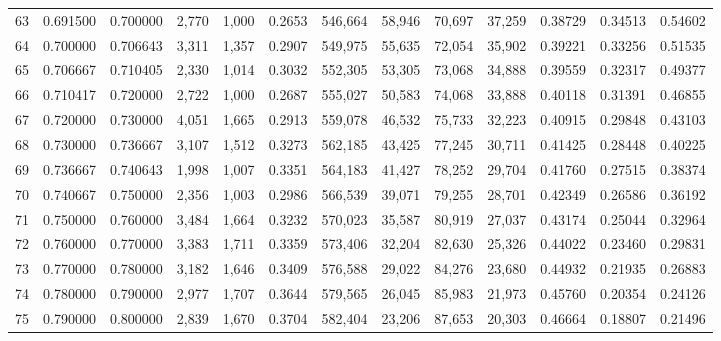 \begin{tabular}{rrrrrrrrrrrrr}
63 &  0.691500 &  0.700000 &   2,770 &  1,000 &                                     0.2653 &  546,664 &   58,946 &   70,697 &   37,259 &  0.38729 &  0.34513 &  0.54602 \\
64 &  0.700000 &  0.706643 &   3,311 &  1,357 &                                     0.2907 &  549,975 &   55,635 &   72,054 &   35,902 &  0.39221 &  0.33256 &  0.51535 \\
65 &  0.706667 &  0.710405 &   2,330 &  1,014 &                                     0.3032 &  552,305 &   53,305 &   73,068 &   34,888 &  0.39559 &  0.32317 &  0.49377 \\
66 &  0.710417 &  0.720000 &   2,722 &  1,000 &                                     0.2687 &  555,027 &   50,583 &   74,068 &   33,888 &  0.40118 &  0.31391 &  0.46855 \\
67 &  0.720000 &  0.730000 &   4,051 &  1,665 &                                     0.2913 &  559,078 &   46,532 &   75,733 &   32,223 &  0.40915 &  0.29848 &  0.43103 \\
68 &  0.730000 &  0.736667 &   3,107 &  1,512 &                                     0.3273 &  562,185 &   43,425 &   77,245 &   30,711 &  0.41425 &  0.28448 &  0.40225 \\
69 &  0.736667 &  0.740643 &   1,998 &  1,007 &                                     0.3351 &  564,183 &   41,427 &   78,252 &   29,704 &  0.41760 &  0.27515 &  0.38374 \\
70 &  0.740667 &  0.750000 &   2,356 &  1,003 &                                     0.2986 &  566,539 &   39,071 &   79,255 &   28,701 &  0.42349 &  0.26586 &  0.36192 \\
71 &  0.750000 &  0.760000 &   3,484 &  1,664 &                                     0.3232 &  570,023 &   35,587 &   80,919 &   27,037 &  0.43174 &  0.25044 &  0.32964 \\
72 &  0.760000 &  0.770000 &   3,383 &  1,711 &                                     0.3359 &  573,406 &   32,204 &   82,630 &   25,326 &  0.44022 &  0.23460 &  0.29831 \\
73 &  0.770000 &  0.780000 &   3,182 &  1,646 &                                     0.3409 &  576,588 &   29,022 &   84,276 &   23,680 &  0.44932 &  0.21935 &  0.26883 \\
74 &  0.780000 &  0.790000 &   2,977 &  1,707 &                                     0.3644 &  579,565 &   26,045 &   85,983 &   21,973 &  0.45760 &  0.20354 &  0.24126 \\
75 &  0.790000 &  0.800000 &   2,839 &  1,670 &                                     0.3704 &  582,404 &   23,206 &   87,653 &   20,303 &  0.46664 &  0.18807 &  0.21496 \\

\end{tabular}
